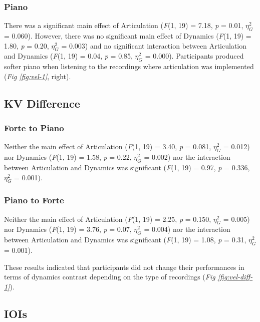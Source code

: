 \documentclass[
  man,floatsintext]{apa6}
\begin{document}
\hypertarget{piano}{%
\subsubsection{Piano}\label{piano}}

There was a significant main effect of Articulation (\emph{F}(1, 19) = 7.18, \emph{p} = 0.01, \(\eta_G^2\) = 0.060). However, there was no significant main effect of Dynamics (\emph{F}(1, 19) = 1.80, \emph{p} = 0.20, \(\eta_G^2\) = 0.003) and no significant interaction between Articulation and Dynamics (\emph{F}(1, 19) = 0.04, \emph{p} = 0.85, \(\eta_G^2\) = 0.000). Participants produced softer piano when listening to the recordings where articulation was implemented (\emph{Fig \ref{fig:vel-1}}, right).

\hypertarget{kv-difference}{%
\subsection{KV Difference}\label{kv-difference}}

\hypertarget{forte-to-piano}{%
\subsubsection{Forte to Piano}\label{forte-to-piano}}

Neither the main effect of Articulation (\emph{F}(1, 19) = 3.40, \emph{p} = 0.081, \(\eta_G^2\) = 0.012) nor Dynamics (\emph{F}(1, 19) = 1.58, \emph{p} = 0.22, \(\eta_G^2\) = 0.002) nor the interaction between Articulation and Dynamics was significant (\emph{F}(1, 19) = 0.97, \emph{p} = 0.336, \(\eta_G^2\) = 0.001).

\hypertarget{piano-to-forte}{%
\subsubsection{Piano to Forte}\label{piano-to-forte}}

Neither the main effect of Articulation (\emph{F}(1, 19) = 2.25, \emph{p} = 0.150, \(\eta_G^2\) = 0.005) nor Dynamics (\emph{F}(1, 19) = 3.76, \emph{p} = 0.07, \(\eta_G^2\) = 0.004) nor the interaction between Articulation and Dynamics was significant (\emph{F}(1, 19) = 1.08, \emph{p} = 0.31, \(\eta_G^2\) = 0.001).

These results indicated that participants did not change their performances in terms of dynamics contrast depending on the type of recordings (\emph{Fig \ref{fig:vel-diff-1}}).

\hypertarget{iois}{%
\subsection{IOIs}\label{iois}}
\end{document}
